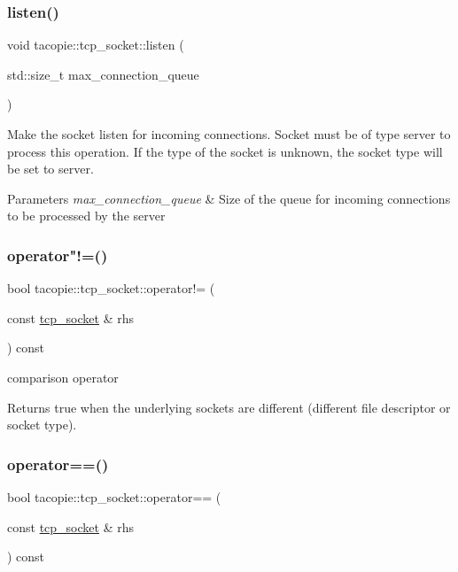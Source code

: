\subsubsection{\texorpdfstring{listen()}{listen()}}
{\footnotesize\ttfamily void tacopie\+::tcp\+\_\+socket\+::listen (\begin{DoxyParamCaption}\item[{std\+::size\+\_\+t}]{max\+\_\+connection\+\_\+queue }\end{DoxyParamCaption})}

Make the socket listen for incoming connections. Socket must be of type server to process this operation. If the type of the socket is unknown, the socket type will be set to server.


\begin{DoxyParams}{Parameters}
{\em max\+\_\+connection\+\_\+queue} & Size of the queue for incoming connections to be processed by the server \\
\hline
\end{DoxyParams}
\mbox{\label{classtacopie_1_1tcp__socket_a76f69612969374b5aa542378d37ee398}} 
\subsubsection{\texorpdfstring{operator"!=()}{operator!=()}}
{\footnotesize\ttfamily bool tacopie\+::tcp\+\_\+socket\+::operator!= (\begin{DoxyParamCaption}\item[{const \hyperlink{classtacopie_1_1tcp__socket}{tcp\+\_\+socket} \&}]{rhs }\end{DoxyParamCaption}) const}

comparison operator

\begin{DoxyReturn}{Returns}
true when the underlying sockets are different (different file descriptor or socket type). 
\end{DoxyReturn}
\mbox{\label{classtacopie_1_1tcp__socket_a69fde61058ab72d88ce48f557d8216cf}} 
\subsubsection{\texorpdfstring{operator==()}{operator==()}}
{\footnotesize\ttfamily bool tacopie\+::tcp\+\_\+socket\+::operator== (\begin{DoxyParamCaption}\item[{const \hyperlink{classtacopie_1_1tcp__socket}{tcp\+\_\+socket} \&}]{rhs }\end{DoxyParamCaption}) const}

